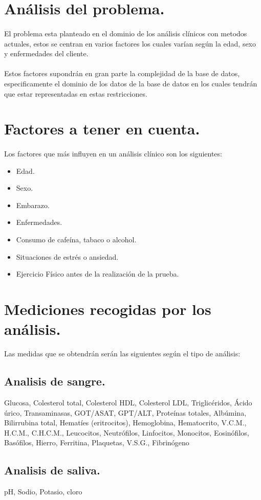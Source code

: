 \documentclass[a4paper,10pt]{article}
\begin{document}
\section{Análisis del problema.}
\paragraph{}
El problema esta planteado en el dominio de los análisis clínicos con metodos actuales, estos se centran en varios factores los cuales varían según la edad, sexo y enfermedades del cliente.
\paragraph{}
Estos factores supondrán en gran parte la complejidad de la base de datos, especificamente el dominio de los datos de la base de datos en los cuales tendrán que estar representadas en estas restricciones.
\section{Factores a tener en cuenta.}
\paragraph{}
Los factores que más influyen en un análisis clínico son los siguientes:
\begin{itemize}
	\item Edad.
	\item Sexo.
	\item Embarazo.
	\item Enfermedades.
	\item Consumo de cafeína, tabaco o alcohol.
	\item Situaciones de estrés o ansiedad.
	\item Ejercicio Físico antes de la realización de la prueba.
\end{itemize}

\section{Mediciones recogidas por los análisis.}
Las medidas que se obtendrán serán las siguientes según el tipo de  análisis:
\subsection{Analisis de sangre.}
Glucosa, Colesterol total, Colesterol HDL, Colesterol LDL, Triglicéridos, Ácido úrico, Transaminasas, GOT/ASAT, GPT/ALT, Proteínas totales, Albúmina, Bilirrubina total, Hematíes (eritrocitos), Hemoglobina, Hematocrito, V.C.M., H.C.M., C.H.C.M., Leucocitos, Neutrófilos, Linfocitos, Monocitos, Eosinófilos, Basófilos, Hierro, Ferritina, Plaquetas, V.S.G., Fibrinógeno \subsection{Analisis de saliva.}
pH, Sodio, Potasio, cloro
\end{document}
